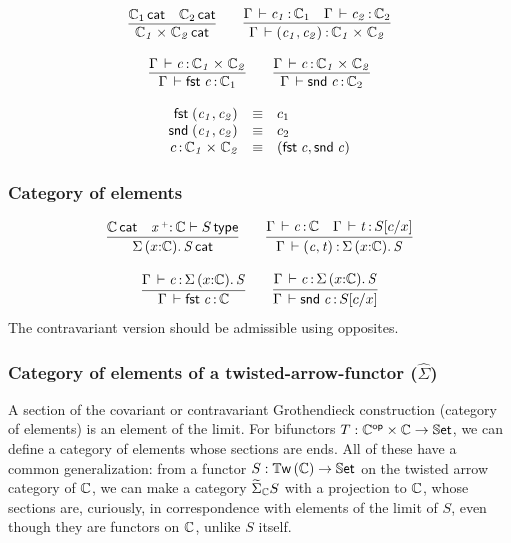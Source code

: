 \documentclass[11pt]{article}
\theoremstyle{plain}
\begin{document}
\[
\begin{array}{c}
\infer{\wfdtp{\prd{\C_1}{\C_2}}}
      {\wfdtp{\C_1} &
        \wfdtp{\C_2}}
\qquad
\infer{\ofdtp{\Gamma}{\pair{c_1}{c_2}}{\prd {\C_1} {\C_2}}}
      {\ofdtp{\Gamma}{c_1}{\C_1} &
       \ofdtp{\Gamma}{c_2}{\C_2}}
\\ \\
\infer{\ofdtp{\Gamma}{\fst c}{\C_1}}
      {\ofdtp{\Gamma}{c}{\prd{\C_1}{\C_2}}}
\qquad
\infer{\ofdtp{\Gamma}{\snd c}{\C_2}}
      {\ofdtp{\Gamma}{c}{\prd{\C_1}{\C_2}}}
\end{array}
\]

\[
\begin{array}{rcll}
\mathit{\mathsf{fst}_{} \: \mathit{(c_1,c_2)_{}}} & \equiv & c_1 \\
\mathit{\mathsf{snd}_{} \: \mathit{(c_1,c_2)_{}}} & \equiv & c_2 \\
c \, \mathit{:} \, \mathit{\mathbb{C}_1} \times_{\mathit{}} \mathit{\mathbb{C}_2} & \equiv & \mathit{(\mathit{\mathsf{fst}_{} \: c},\mathit{\mathsf{snd}_{} \: c})_{}}
\end{array}
\]

\subsubsection{Category of elements}
\[
\begin{array}{c}
\infer{\wfdtp{\sigmacat{x}{\C}{S}}}
      {\wfdtp{\C} &
        \wftp{\catvar{x}{\co}{\C}}{S}}
\qquad
\infer{\ofdtp{\Gamma}{\pair{c}{t}}{\sigmacat x \C S}}
      {\ofdtp{\Gamma}{c}{\C} &
       \oftp{\Gamma}{t}{\tsubst{S}{c/x}}}
\\ \\
\infer{\ofdtp{\Gamma}{\fst c}{\C}}
      {\ofdtp{\Gamma}{c}{\sigmacat{x}{\C}{S}}}
\qquad
\infer{\oftp{\Gamma}{\snd c}{\tsubst{S}{c/x}}}
      {\ofdtp{\Gamma}{c}{\sigmacat{x}{\C}{S}}}
\end{array}
\]
The contravariant version should be admissible using opposites.

\subsubsection{Category of elements of a twisted-arrow-functor ($\hat{\Sigma}$)}
A section of the covariant or contravariant Grothendieck construction (category of elements) is an element of the limit. For bifunctors $T: \mathbb{C} ^{\mathsf{op}} \times \mathbb{C} \to \mathbb{S}\mathsf{et}$, we can define a category of elements whose sections are ends. All of these have a common generalization: from a functor $S : \mathbb{T}\mathsf{w}\left(\mathbb{C}\right) \to \mathbb{S}\mathsf{et}$ on the twisted arrow category of $\mathbb{C}$, we can make a category $\widetilde\Sigma_{\mathbb{C}} S$ with a projection to $\mathbb{C}$, whose sections are, curiously, in correspondence with elements of the limit of $S$, even though they are functors on $\mathbb{C}$, unlike $S$ itself.
\end{document}
